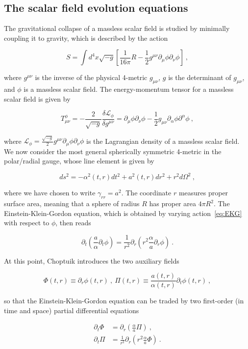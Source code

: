 \documentclass[a4paper,11pt]{article}
\renewcommand{\a}{\alpha}
\renewcommand{\d}{\delta}
\newcommand{\g}{\gamma}
\newcommand{\gDD}[2]{\g_{{#1}{#2}}}
\newcommand{\GDD}[2]{g_{{#1}{#2}}}
\newcommand{\GUU}[2]{g^{{#1}{#2}}}
\newcommand{\sqrtGdet}{\sqrt{-g}}
\newcommand{\pd}{\partial}
\renewcommand{\L}{\mathcal{L}}
\newcommand{\lrpar}[1]{\left( #1 \right)}
\newcommand{\lrsquare}[1]{\left[ #1 \right]}
\newcommand{\n}{\noindent}
\newcommand{\eq}[1]{
  \begin{equation}
    #1
  \end{equation}
}
\newcommand{\al}[1]{
  \begin{align}
    #1
  \end{align}
}
\begin{document}
\subsection{The scalar field evolution equations}

The gravitational collapse of a massless scalar field is studied by minimally coupling it to gravity, which is described by the action

\eq{S = \int d^{4}x \sqrtGdet \lrsquare{\frac{1}{16\pi}R - \frac{1}{2}\GUU{\mu}{\nu}\pd_{\mu}\phi\pd_{\nu}\phi}\ ,\label{eq:EKG}}

\n where $\GUU{\mu}{\nu}$ is the inverse of the physical 4-metric $\GDD{\mu}{\nu}$, $g$ is the determinant of $\GDD{\mu}{\nu}$, and $\phi$ is a massless scalar field. The energy-momentum tensor for a massless scalar field is given by

\eq{ T^{\phi}_{\mu\nu} = -\frac{2}{\sqrtGdet}\frac{\d\L_{\phi}}{\d\GUU{\mu}{\nu}} = \pd_{\mu}\phi\pd_{\nu}\phi - \frac{1}{2}\GDD{\mu}{\nu}\pd_{\a}\phi\pd^{\a}\phi\ , }

\n where $\L_{\phi} = \frac{\sqrtGdet}{2}\GUU{\mu}{\nu}\pd_{\mu}\phi\pd_{\nu}\phi$ is the Lagrangian density of a massless scalar field. We now consider the most general spherically symmetric 4-metric in the polar/radial gauge, whose line element is given by

\eq{ ds^{2} = -\a^{2}\lrpar{t,r}dt^{2} + a^{2}\lrpar{t,r}dr^{2} + r^{2}d\Omega^{2}\ , }

\n where we have chosen to write $\gDD{r}{r} = a^{2}$. The coordinate $r$ measures proper surface area, meaning that a sphere of radius $R$ has proper area $4\pi R^{2}$. The Einstein-Klein-Gordon equation, which is obtained by varying action~\eqref{eq:EKG} with respect to $\phi$, then reads

\eq{ \pd_{t}\lrpar{\frac{a}{\a}\pd_{t}\phi} = \frac{1}{r^{2}}\pd_{r}\lrpar{r^{2}\frac{\a}{a}\pd_{r}\phi}\ . }

\n At this point, Choptuik introduces the two auxiliary fields

\eq{ \Phi\lrpar{t,r} \equiv \pd_{r}\phi\lrpar{t,r}\ ,\ \Pi\lrpar{t,r} \equiv \frac{a\lrpar{t,r}}{\a\lrpar{t,r}}\pd_{t}\phi\lrpar{t,r}\ , }

\n so that the Einstein-Klein-Gordon equation can be traded by two first-order (in time and space) partial differential equations

\al{
  \pd_{t}\Phi &= \pd_{r}\lrpar{\frac{\a}{a}\Pi}\ , \label{eq:chop1}\\
  \pd_{t}\Pi  &= \frac{1}{r^{2}}\pd_{r}\lrpar{r^{2}\frac{\a}{a}\Phi} \label{eq:chop2}\ .
}
\end{document}
